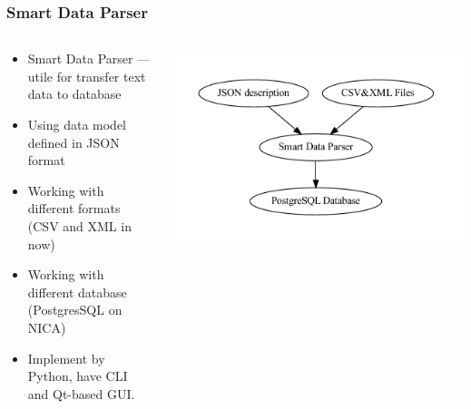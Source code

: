 \documentclass[8pt,pdf,hyperref={unicode}]{beamer}
\begin{document}
\begin{frame}
	\frametitle{Smart Data Parser}
	\begin{columns}
		\begin{column}{0.5\linewidth}
			\begin{itemize}
				\item Smart Data Parser --- utile for transfer text data to database
				\item Using data model defined in JSON format
				\item Working with different formats (CSV and XML in now)
				\item Working with different database (PostgresSQL on NICA)
				\item Implement by Python, have CLI and Qt-based GUI. 
			\end{itemize}
		\end{column}
		\begin{column}{0.6\linewidth}
			\includegraphics[width=\linewidth]{image/schema_1.dot.pdf}
		\end{column}
	\end{columns}
\end{frame}
\end{document}

